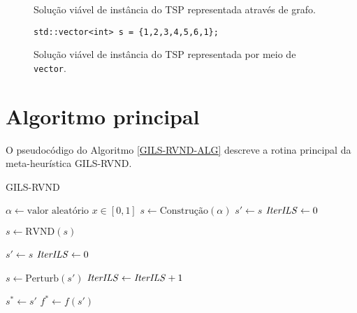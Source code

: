 \begin{figure}[!htbp]
    \centering
    \caption{Solução viável de instância do TSP representada através de grafo.}
    \label{fig:1}
\end{figure}

\begin{figure}[H]
    \centering
    
        \begin{lstlisting}
std::vector<int> s = {1,2,3,4,5,6,1};
        \end{lstlisting}

    \caption{Solução viável de instância do TSP representada por meio de \texttt{vector}.}
    \label{fig:2}
\end{figure}

\section{Algoritmo principal}
O pseudocódigo do Algoritmo \ref{GILS-RVND-ALG} descreve a rotina principal da meta-heurística GILS-RVND.
\begin{algorithm}
\caption{GILS-RVND}\label{euclid}
\begin{algorithmic}[1]


\State \(\alpha \gets \text{valor aleatório } x \in [0, 1]\) 
\State \(s \gets \text{Construção}(\alpha)\)
\State \(s' \gets s\)
\State \(\text{\textit{IterILS}} \gets 0\)

\State \(s \gets \text{RVND}(s)\)

\State \(s' \gets s\)
\State \(\text{\textit{IterILS}} \gets 0\)
\EndIf

\State \(s \gets \text{Perturb}(s')\)
\State \(\text{\textit{IterILS}} \gets \text{\textit{IterILS}} + 1\)

\EndWhile

\State \(s^* \gets s'\)
\State \(f^* \gets f(s')\)
\EndIf

\EndFor

\EndProcedure
\end{algorithmic}
\label{GILS-RVND-ALG}
\end{algorithm}
    
